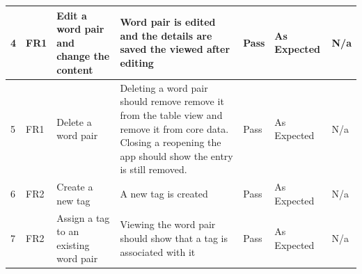 \documentclass[paper=a4, fontsize=11pt]{scrartcl}	%
\numberwithin{equation}{section}															%
\numberwithin{figure}{section}																%
\numberwithin{table}{section}
\begin{document}
\begin{landscape}
\begin{longtable}{|l|p{2cm}|p{5cm}|p{5cm}|l|p{5cm}|p{5cm}|}
4  & FR1                    & Edit a word pair and change the content              & Word pair is edited and the details are saved the viewed after editing                                                                                                                                                                     & Pass      & As Expected                                        & N/a                                                                                                                                                                                                                        \\ \hline
5  & FR1                    & Delete a word pair                                   & Deleting a word pair should remove remove it from the table view and remove it from core data. Closing a reopening the app should show the entry is still removed.                                                                         & Pass      & As Expected                                        & N/a                                                                                                                                                                                                                        \\ \hline
6  & FR2                    & Create a new tag                                     & A new tag is created                                                                                                                                                                                                                       & Pass      & As Expected                                        & N/a                                                                                                                                                                                                                        \\ \hline
7  & FR2                    & Assign a tag to an existing word pair                & Viewing the word pair should show that a tag is associated with it                                                                                                                                                                         & Pass      & As Expected                                        & N/a                                                                                                                                                                                                                        \\ \hline

\end{longtable}
\end{landscape}
\end{document}
